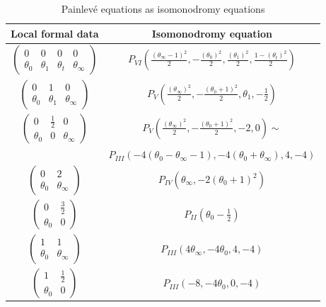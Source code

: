 \documentclass[12]{amsart}
\begin{document}
\begin{table}[h]
\caption{Painlev\'e equations as isomonodromy equations}
\begin{center}
\begin{tabular}{|c|c|}
\hline 
Local formal data  & Isomonodromy equation \\
\hline
$\begin{pmatrix}0&0&0&0\\ \theta_0&\theta_1&\theta_t&\theta_\infty\end{pmatrix}$ & $P_{VI}\left(\frac{(\theta_\infty-1)^2}{2},-\frac{(\theta_0)^2}{2},\frac{(\theta_1)^2}{2},\frac{1-(\theta_t)^2}{2}\right)$\\
\hline
$\begin{pmatrix}0&1&0\\ \theta_0&\theta_1&\theta_\infty\end{pmatrix}$ & $P_{V}\left(\frac{(\theta_\infty)^2}{2},-\frac{(\theta_0+1)^2}{2},\theta_1,-\frac{1}{2}\right)$\\
\hline
$\begin{pmatrix}0&\frac{1}{2}&0\\ \theta_0&0&\theta_\infty\end{pmatrix}$ & $P_{V}\left(\frac{(\theta_\infty)^2}{2},-\frac{(\theta_0+1)^2}{2},-2,0\right)\sim $\\
&{\small $P_{III}\left(-4(\theta_0-\theta_\infty-1),-4(\theta_0+\theta_\infty),4,-4\right)$}\\
\hline
$\begin{pmatrix}0&2\\ \theta_0&\theta_\infty\end{pmatrix}$ & $P_{IV}\left(\theta_\infty,-2(\theta_0+1)^2\right)$\\
\hline
$\begin{pmatrix}0&\frac{3}{2}\\ \theta_0&0\end{pmatrix}$ & $P_{II}\left(\theta_0-\frac{1}{2}\right)$\\
\hline
$\begin{pmatrix}1&1\\ \theta_0&\theta_\infty\end{pmatrix}$ & $P_{III}\left(4\theta_\infty,-4\theta_0,4,-4\right)$\\
\hline
$\begin{pmatrix}1&\frac{1}{2}\\ \theta_0&0\end{pmatrix}$ & $P_{III}\left(-8,-4\theta_0,0,-4\right)$\\

\end{tabular}
\end{center}
\end{table}
\end{document}
